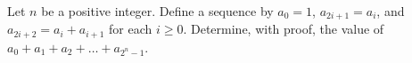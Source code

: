 Let $n$ be a positive integer. Define a sequence by $a_0 = 1$, $a_{2i+1} = a_i$, and $a_{2i+2} = a_i + a_{i+1}$ for each $i \ge 0$. Determine, with proof, the value of $a_0 + a_1 + a_2 + \dots + a_{2^n-1}$.

